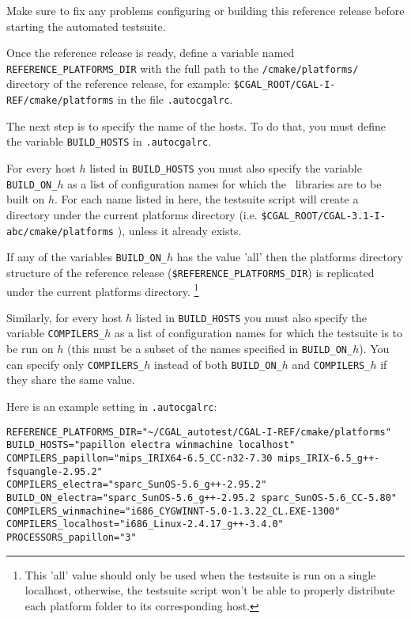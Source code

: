 Make sure to fix any problems configuring or building this reference release before starting the automated testsuite.

Once the reference release is ready, define a variable named
{\tt REFERENCE\_PLATFORMS\_DIR} with the full path to the {\tt /cmake/platforms/}
directory of the reference release, for example:
{\tt \$CGAL\_ROOT/CGAL-I-REF/cmake/platforms}
in the file {\tt .autocgalrc}.

The next step is to specify the name of the hosts. To do that, you
must define the variable \texttt{BUILD\_HOSTS} in {\tt .autocgalrc}. 

For every host $h$ listed in \texttt{BUILD\_HOSTS} you
must also specify the variable \texttt{BUILD\_ON\_$h$} as a list of
configuration names for which the \cgal\ libraries are
to be built on $h$. For each name listed in here, the testsuite script 
will create a directory under the current platforms directory
(i.e. {\tt \$CGAL\_ROOT/CGAL-3.1-I-abc/cmake/platforms} ), unless it already exists.

If any of the variables \texttt{BUILD\_ON\_$h$}
has the value 'all' then the platforms directory structure of the reference
release ({\tt \$REFERENCE\_PLATFORMS\_DIR}) is replicated
under the current platforms directory. \footnote{This 'all' value should only be used when
 the testsuite is run on a single localhost, otherwise, the testsuite script won't be able to
properly distribute each platform folder to its corresponding host.}

Similarly, for every host $h$ listed in \texttt{BUILD\_HOSTS} you
must also specify the variable \texttt{COMPILERS\_$h$} as a list of
configuration names for which the testsuite is to be run on $h$
(this must be a subset of the names specified in \texttt{BUILD\_ON\_$h$}).
You can specify only \texttt{COMPILERS\_$h$} instead of both \texttt{BUILD\_ON\_$h$}
and \texttt{COMPILERS\_$h$} if they share the same value.

\noindent Here is an example setting in {\tt .autocgalrc}:

\begingroup\small
\begin{verbatim}
REFERENCE_PLATFORMS_DIR="~/CGAL_autotest/CGAL-I-REF/cmake/platforms"
BUILD_HOSTS="papillon electra winmachine localhost"
COMPILERS_papillon="mips_IRIX64-6.5_CC-n32-7.30 mips_IRIX-6.5_g++-fsquangle-2.95.2"
COMPILERS_electra="sparc_SunOS-5.6_g++-2.95.2"
BUILD_ON_electra="sparc_SunOS-5.6_g++-2.95.2 sparc_SunOS-5.6_CC-5.80"
COMPILERS_winmachine="i686_CYGWINNT-5.0-1.3.22_CL.EXE-1300"
COMPILERS_localhost="i686_Linux-2.4.17_g++-3.4.0"
PROCESSORS_papillon="3" 
\end{verbatim}\endgroup

